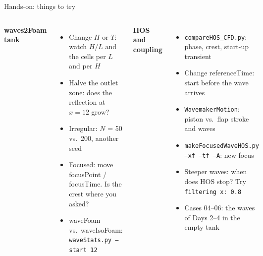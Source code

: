 \documentclass[aspectratio=169,10pt]{beamer}
\newcommand{\key}[1]{{\leavevmode\ttfamily\color{sea}#1}}
\begin{document}
{
 \renewcommand{\key}[1]{{\leavevmode\ttfamily\color{sand}#1}}
\begin{frame}[plain]{Hands-on: things to try}
  \small
  \begin{columns}[T]
    \color{foam}
    {\color{sand}\bfseries waves2Foam tank}
    \begin{itemize}
      \item Change $H$ or $T$: watch $H/L$ and the cells per $L$ and per $H$
      \item Halve the outlet zone: does the reflection at $x=12$ grow?
      \item Irregular: $N$ = 50 vs.\ 200, another seed
      \item Focused: move \key{focusPoint} / \key{focusTime}. Is the crest where you asked?
      \item waveFoam vs.\ waveIsoFoam: \texttt{waveStats.py --start 12}
    \end{itemize}
    \color{foam}
    {\color{sand}\bfseries HOS and coupling}
    \begin{itemize}
      \item \texttt{compareHOS\_CFD.py}: phase, crest, start-up transient
      \item Change \key{referenceTime}: start before the wave arrives
      \item \texttt{WavemakerMotion}: piston vs.\ flap stroke and waves
      \item \texttt{makeFocusedWaveHOS.py --xf --tf --A}: new focus
      \item Steeper waves: when does HOS stop? Try \texttt{filtering x: 0.8}
      \item Cases 04--06: the waves of Days 2--4 in the empty tank
    \end{itemize}
  \end{columns}
\end{frame}}
\end{document}
